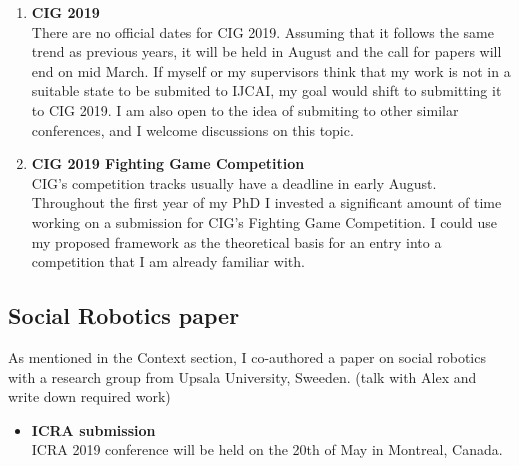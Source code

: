 \documentclass{article}
\begin{document}
\begin{enumerate}
    \item \textbf{CIG 2019} \\
        There are no official dates for CIG 2019. Assuming that it follows the same trend as previous years, it will be held in August and the call for papers will end on mid March. If myself or my supervisors think that my work is not in a suitable state to be submited to IJCAI, my goal would shift to submitting it to CIG 2019. I am also open to the idea of submiting to other similar conferences, and I welcome discussions on this topic.
    \item \textbf{CIG 2019 Fighting Game Competition} \\
       CIG's competition tracks usually have a deadline in early August. Throughout the first year of my PhD I invested a significant amount of time working on a submission for CIG's Fighting Game Competition. I could use my proposed framework as the theoretical basis for an entry into a competition that I am already familiar with.
\end{enumerate}

\subsection{Social Robotics paper}
As mentioned in the Context section, I co-authored a paper on social robotics with a research group from Upsala University, Sweeden. (talk with Alex and write down required work)

\begin{itemize}
    \item \textbf{ICRA submission} \\
        ICRA 2019 conference will be held on the 20th of May in Montreal, Canada.
\end{itemize}
\end{document}
